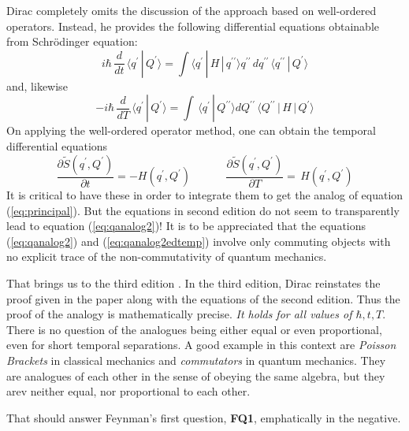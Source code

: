 \documentclass[12pt]{article}
\newcommand{\be}{\begin{equation}}
\newcommand{\ee}{\end{equation}}
\begin{document}
Dirac completely omits the discussion of the approach based on well-ordered operators. Instead, he provides the following differential equations
obtainable from Schr\"odinger equation:
\be
\label{eq:qanalog2ed}
i \hbar\,\frac{d}{dt}\,\langle q^\prime\,|\,Q^\prime\rangle =  \int  \langle q^\prime\,|\,H\,|\,q^{\prime\prime} \rangle  q^{\prime\prime}\,
dq^{\prime\prime}\, \langle q^{\prime\prime}\,|\,Q^\prime\rangle
\ee
and, likewise
\be
\label{eq:qanalog2ed2}
- i \hbar\,\frac{d}{dT}\,\langle q^\prime\,|\,Q^\prime\rangle =  \int  
\,\langle q^{\prime}\,|\,Q^{\prime\prime}\rangle
dQ^{\prime\prime}\,
\langle Q^{\prime\prime}\,|\,H\,|\,Q^\prime \rangle  
\ee
On applying the well-ordered operator method, one can obtain the temporal differential equations
\be
\frac{\partial {\tilde S}(q^\prime,Q^\prime)}{\partial t} = - H(q^\prime,Q^\prime)\quad\quad\quad\,
\frac{\partial {\tilde S}(q^\prime,Q^\prime)}{\partial T} = \,H(q^\prime,Q^\prime)
\label{eq:qanalog2edtemp}
\ee
It is critical to have these in order to integrate them to get the analog of equation (\ref{eq:principal}). But the equations in second edition
do not seem to transparently lead to equation (\ref{eq:qanalog2})! It is to be appreciated that the equations (\ref{eq:qanalog2}) and (\ref{eq:qanalog2edtemp}) involve only commuting objects with no explicit trace of the non-commutativity of quantum mechanics. 

That brings us to the third edition \cite{diracbook3}.
In the third edition, Dirac reinstates the proof given in the paper along with the equations of the second edition. Thus the proof of the 
analogy is mathematically precise. {\it It holds for all values of $\hbar,t,T$}. There is no question of the analogues being either
equal or even proportional, even for short temporal separations. A good example in this context are \emph{Poisson Brackets} in classical
mechanics and \emph{commutators} in quantum mechanics. They are analogues of each other in the sense of obeying the same algebra, but
they arev neither equal, nor proportional to each other.

That should answer Feynman's first question, {\bf FQ1}, emphatically in the negative.
\end{document}
